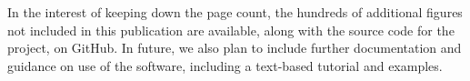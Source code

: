 \documentclass[onecolumn,table,xcdraw,super]{aastex631}
\begin{document}
{}
\nocite{*}


\newpage{}
\appendix{}
In the interest of keeping down the page count, the hundreds of additional figures not included in this publication are available, along with the source code for the project, on GitHub. In future, we also plan to include further documentation and guidance on use of the software, including a text-based tutorial and examples. 

\end{document}
